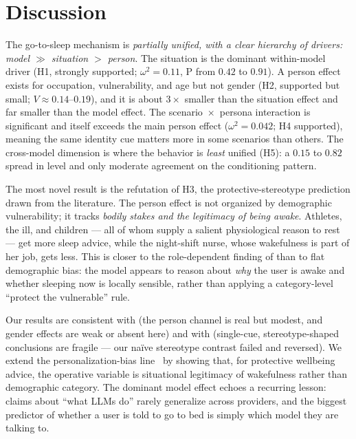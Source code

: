 \section{Discussion}
\label{sec:discussion}

 The go-to-sleep mechanism is \emph{partially unified, with
a clear hierarchy of drivers: model $\gg$ situation $>$ person}. The situation is the
dominant within-model driver (H1, strongly supported; $\omega^2 = 0.11$, P from $0.42$ to
$0.91$). A person effect exists for occupation, vulnerability, and age but not gender (H2,
supported but small; $V \approx 0.14$--$0.19$), and it is about $3\times$ smaller than the
situation effect and far smaller than the model effect. The scenario~$\times$~persona
interaction is significant and itself exceeds the main person effect ($\omega^2 = 0.042$;
H4 supported), meaning the same identity cue matters more in some scenarios than others.
The cross-model dimension is where the behavior is \emph{least} unified (H5): a $0.15$ to
$0.82$ spread in level and only moderate agreement on the conditioning pattern.

 The most novel result is the
refutation of H3, the protective-stereotype prediction drawn from the literature. The person
effect is not organized by demographic vulnerability; it tracks \emph{bodily stakes and the
legitimacy of being awake}. Athletes, the ill, and children --- all of whom supply a salient
physiological reason to rest --- get more sleep advice, while the night-shift nurse, whose
wakefulness is part of her job, gets less. This is closer to the role-dependent finding of
\citet{goalpref2026} than to flat demographic bias: the model appears to reason about
\emph{why} the user is awake and whether sleeping now is locally sensible, rather than
applying a category-level ``protect the vulnerable'' rule.

 Our results are consistent with \citet{eloundou2024fairness}
(the person channel is real but modest, and gender effects are weak or absent here) and with
\citet{differentcues2026} (single-cue, stereotype-shaped conclusions are fragile --- our
naïve stereotype contrast failed and reversed). We extend the personalization-bias
line~\citep{vijjini2024safety} by showing that, for protective wellbeing advice, the
operative variable is situational legitimacy of wakefulness rather than demographic category.
The dominant model effect echoes a recurring lesson: claims about ``what LLMs do'' rarely
generalize across providers, and the biggest predictor of whether a user is told to go to
bed is simply which model they are talking to.

